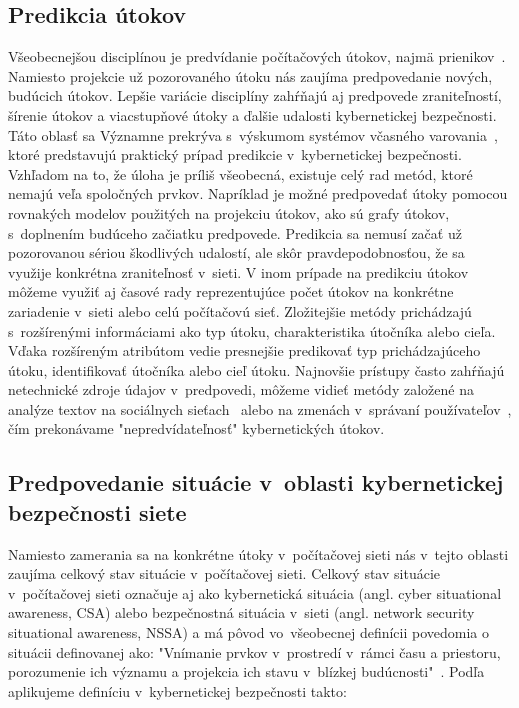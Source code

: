 \documentclass[thesismargins, thesislinespacing, openright, upjsfrontpage]{rnthesis}
\begin{document}
\subsection{Predikcia útokov}

Všeobecnejšou disciplínou je predvídanie počítačových útokov, najmä prienikov~\cite{Abdlhamed2017}. Namiesto projekcie už pozorovaného útoku nás zaujíma predpovedanie nových, budúcich útokov. Lepšie variácie disciplíny zahŕňajú aj predpovede zraniteľností, šírenie útokov a viacstupňové útoky a ďalšie udalosti kybernetickej bezpečnosti. Táto oblasť sa Významne prekrýva s~výskumom systémov včasného varovania~\cite{ramaki2016survey}, ktoré predstavujú praktický prípad predikcie v~kybernetickej bezpečnosti. Vzhľadom na to, že úloha je príliš všeobecná, existuje celý rad metód, ktoré nemajú veľa spoločných prvkov. Napríklad je možné predpovedať útoky pomocou rovnakých modelov použitých na projekciu útokov, ako sú grafy útokov, s~doplnením budúceho začiatku predpovede. Predikcia sa nemusí začať už pozorovanou sériou škodlivých udalostí, ale skôr pravdepodobnosťou, že sa využije konkrétna zraniteľnosť v~sieti. 
V inom prípade na predikciu útokov môžeme využiť aj časové rady reprezentujúce počet útokov na konkrétne zariadenie v~sieti alebo celú počítačovú sieť. Zložitejšie metódy prichádzajú s~rozšírenými informáciami ako typ útoku, charakteristika útočníka alebo cieľa. Vďaka rozšíreným atribútom vedie presnejšie predikovať typ prichádzajúceho útoku, identifikovať útočníka alebo cieľ útoku. Najnovšie prístupy často zahŕňajú netechnické zdroje údajov v~predpovedi, môžeme vidieť metódy založené na analýze textov na sociálnych sieťach~\cite{hernandez2016security,shu2018understanding} alebo na zmenách v~správaní používateľov~\cite{shao2016transparent}, čím prekonávame "nepredvídateľnosť" kybernetických útokov.

\subsection{Predpovedanie situácie v~oblasti kybernetickej bezpečnosti siete} \label{forecast}

Namiesto zamerania sa na konkrétne útoky v~počítačovej sieti nás v~tejto oblasti zaujíma celkový stav situácie v~počítačovej sieti. Celkový stav situácie v~počítačovej sieti označuje aj ako kybernetická situácia (angl. cyber situational awareness, CSA) alebo bezpečnostná situácia v~sieti (angl. network security situational awareness, NSSA) a má pôvod vo~všeobecnej definícii povedomia o situácii definovanej ako:
"Vnímanie prvkov v~prostredí v~rámci času a priestoru, porozumenie ich významu a projekcia ich stavu v~blízkej budúcnosti"~\cite{Endsley1988}. Podľa \cite{Yang2014} aplikujeme definíciu v~kybernetickej bezpečnosti takto: 
\end{document}
